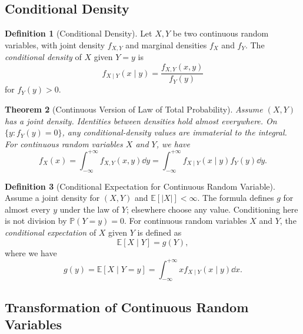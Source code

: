 \documentclass[11pt]{article}
\numberwithin{equation}{section}
\newtheorem{theorem}{Theorem}[section]
\theoremstyle{definition}
\newtheorem{definition}[theorem]{Definition}
\theoremstyle{remark}
\newcommand{\pqty}[1]{\left(#1\right)}
\newcommand{\bqty}[1]{\left[#1\right]}
\newcommand{\plusinfty}{+\infty}
\newcommand{\minusinfty}{-\infty}
\newcommand{\Prob}{\mathbb P}
\newcommand{\Expt}{\mathbb E}
\newcommand{\Conditional}[2]{#1\mid #2}
\newcommand{\bound}[1]{{#1}}
\begin{document}
\subsection{Conditional Density}

\begin{definition}[Conditional Density]\label{probability-definition-055}
    \label{probability-def:conditional-density}%
    Let \(X, Y\) be two continuous random variables, with joint density \(f_{X, Y}\) and marginal densities \(f_{X}\) and \(f_{Y}\). The \emph{conditional density} of \(X\) given \(Y = y\) is
    \[
        f_{\bound{\Conditional{X}{Y}}} \pqty{\Conditional{x}{y}} = \frac{f_{X, Y}\pqty{x, y}}{f_Y\pqty{y}}
    \]
    for \(f_Y\pqty{y} > 0\).
\end{definition}

\begin{theorem}[Continuous Version of Law of Total Probability]\label{probability-theorem-020}
    \label{probability-thm:cont-law-total-prob}%
Assume \((X,Y)\) has a joint density. Identities between densities hold almost everywhere. On \(\{y:f_Y(y)=0\}\), any conditional-density values are immaterial to the integral.
    For continuous random variables \(X\) and \(Y\), we have
    \[
        f_X\pqty{x} = \int_{\minusinfty}^{\plusinfty} f_{X, Y} \pqty{x, y} \dd{y} = \int_{\minusinfty}^{\plusinfty} f_{\bound{\Conditional{X}{Y}}} \pqty{\Conditional{x}{y}} f_Y\pqty{y} \dd{y}.
    \]
\end{theorem}

\begin{definition}[Conditional Expectation for Continuous Random Variable]\label{probability-definition-056}
    \label{probability-def:conditional-expectation-crv}%
Assume a joint density for \((X,Y)\) and \(\Expt[|X|]<\infty\). The formula defines \(g\) for almost every \(y\) under the law of \(Y\); elsewhere choose any value. Conditioning here is not division by \(\Prob(Y=y)=0\).
    For continuous random variables \(X\) and \(Y\), the \emph{conditional expectation} of \(X\) given \(Y\) is defined as
    \[
        \Expt\bqty{\Conditional{X}{Y}} = g\pqty{Y},
    \]
    where we have
    \[
        g\pqty{y} = \Expt\bqty{\Conditional{X}{Y = y}} = \int_{\minusinfty}^{\plusinfty} x f_{\bound{\Conditional{X}{Y}}} \pqty{\Conditional{x}{y}} \dd{x}.
    \]
\end{definition}

\subsection{Transformation of Continuous Random Variables}
\end{document}
